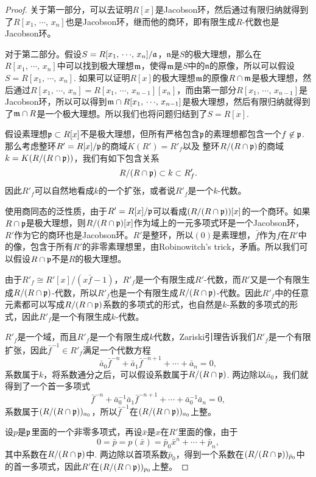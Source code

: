 \begin{proof} 关于第一部分，可以去证明$R[x]$是Jacobson环，然后通过有限归纳就得到了$R[x_1,\,\cdots\!,\,x_n]$也是Jacobson环，继而他的商环，即有限生成$R$-代数也是Jacobson环。

对于第二部分。假设$S=R[x_1,\,\cdots\!,\,x_n]/\mathfrak{a}$，$\mathfrak{n}$是$S$的极大理想，那么在$R[x_1,\,\cdots\!,\,x_n]$中可以找到极大理想$\mathfrak{m}$，使得$\mathfrak{m}$是$S$中的$\mathfrak{n}$的原像，所以可以假设$S=R[x_1,\,\cdots\!,\,x_n]$. 如果可以证明$R[x]$的极大理想$\mathfrak{m}$的原像$R\cap \mathfrak{m}$是极大理想，然后通过$R[x_1,\,\cdots\!,\,x_{n}]=R[x_1,\,\cdots\!,\,x_{n-1}][x_n]$，而由第一部分$R[x_1,\,\cdots\!,\,x_{n-1}]$是Jacobson环，所以可以得到$\mathfrak{m}\cap R[x_1,\,\cdots\!,\,x_{n-1}]$是极大理想，然后有限归纳就得到了$\mathfrak{m} \cap R$是一个极大理想。所以我们也将问题归结到了$S=R[x]$.

假设素理想$\mathfrak{p}\subset R[x]$不是极大理想，但所有严格包含$\mathfrak{p}$的素理想都包含一个$f\not\in \mathfrak{p}$. 那么考虑整环$R'=R[x]/\mathfrak{p}$的商域$K(R')=R'_f$以及
整环$R/(R\cap \mathfrak{p})$的商域$k=K(R/(R\cap \mathfrak{p}))$，我们有如下包含关系
\[
	R/(R\cap \mathfrak{p})\subset k \subset R'_{f}.
\]
因此$R'_f$可以自然地看成$k$的一个扩张，或者说$R'_f$是一个$k$-代数。

使用商同态的泛性质，由于$R'=R[x]/\mathfrak{p}$可以看成$(R/(R\cap \mathfrak{p}))[x]$的一个商环。如果$R\cap \mathfrak{p}$是极大理想，则$R/(R\cap \mathfrak{p})[x]$作为域上的一元多项式环是一个Jacobson环，$R'$作为它的商环也是Jacobson环。$R'$是整环，所以$(0)$是素理想，$\bar{f}$作为$f$在$R'$中的像，包含于所有$R'$的非零素理想里，由Robinowitch's trick，矛盾。所以我们可以假设$R\cap \mathfrak{p}$不是$R$的极大理想。

由于$R'_f\cong R'[x]/(x\bar{f}-1)$，$R'_f$是一个有限生成$R'$-代数，而$R'$又是一个有限生成$R/(R\cap \mathfrak{p})$-代数，所以$R'_{f}$也是一个有限生成$R/(R\cap \mathfrak{p})$-代数。因此$R'_f$中的任意元素都可以写成$R/(R\cap \mathfrak{p})$系数的多项式的形式，也自然是$k$-系数的多项式的形式，因此$R'_f$是一个有限生成$k$-代数。

$R'_f$是一个域，而且$R'_f$是一个有限生成$k$代数，Zariski引理告诉我们$R'_f$是一个有限扩张，因此$\bar{f}^{-1}\in R'_f$满足一个代数方程
\[
	\bar{a}_0\bar{f}^{-n}+\bar{a}_{1}\bar{f}^{-n+1}+\cdots+\bar{a}_n=0,
\]
系数属于$k$，将系数通分之后，可以假设系数属于$R/(R\cap \mathfrak{p})$. 两边除以$\bar{a}_0$，我们就得到了一个首一多项式
\[
	\bar{f}^{-n}+\bar{a}_0^{-1}\bar{a}_{1}\bar{f}^{-n+1}+\cdots+\bar{a}_0^{-1}\bar{a}_n=0,
\]
系数属于$(R/(R\cap \mathfrak{p}))_{a_0}$，所以$\bar{f}^{-1}$在$(R/(R\cap \mathfrak{p}))_{a_0}$上整。

设$p$是$\mathfrak{p}$里面的一个非零多项式，再设$\bar{x}$是$x$在$R'$里面的像，由于
\[
	0=\bar{p}=p(\bar{x})=\bar{p}_0\bar{x}^n+\cdots+\bar{p}_n,
\]
其中系数在$R/(R\cap \mathfrak{p})$中. 两边除以首项系数$\bar{p}_0$，得到一个系数在$(R/(R\cap \mathfrak{p}))_{\bar{p}_0}$中的首一多项式，因此$R'$在$(R/(R\cap \mathfrak{p}))_{p_0}$上整。


\end{proof}
